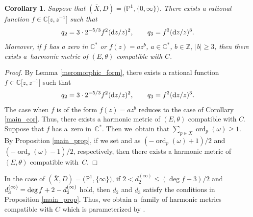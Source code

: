 \documentclass[pdftex]{sigma}
\numberwithin{equation}{section}
\newtheorem{Corollary}[Theorem]{Corollary}
\newcommand{\C}{\mathbb{C}}
\newcommand{\Z}{\mathbb{Z}}
\newcommand{\ps}{\mathbb{P}}
\newcommand{\ord}{\operatorname{ord}}
\begin{document}
\begin{Corollary}\label{main_Cstar_cor}
 Suppose that $(\overline{X},D) = \bigl(\ps^1,\{0,\infty\}\bigr)$. There exists a rational function $f\in \C\bigl[z,z^{-1}\bigr]$ such that
 \begin{equation*}
 q_2 = 3\cdot 2^{-5/3}f^2 ({\rm d}z/z)^2, \qquad q_3 = f^3 ({\rm d}z/z)^3.
 \end{equation*}
 Moreover, if $f$ has a zero in $\C^*$ or $f(z)=a z^b$, $a\in\C^*$, $b\in\Z$, $|b|\geq 3$, then there exists a~harmonic metric of $(E,\theta)$ compatible with $C$.
\end{Corollary}

\begin{proof}
 By Lemma \ref{meromorphic_form}, there exists a rational function $f\in \C\bigl[z,z^{-1}\bigr]$ such that
 \begin{equation*}
 q_2 = 3\cdot 2^{-5/3}f^2 ({\rm d}z/z)^2, \qquad q_3 = f^3 ({\rm d}z/z)^3.
 \end{equation*}
 The case when $f$ is of the form $f(z)=az^b$ reduces to the case of Corollary \ref{main_cor}. Thus, there exists a harmonic metric of $(E,\theta)$ compatible with $C$. Suppose that $f$ has a~zero in~$\C^*$. Then we~obtain that $\sum_{p\in X}\ord_p(\omega)\geq 1$. By Proposition \ref{main_prop}, if we set  and  as $(-\ord_{p}(\omega)+1)/2$ and $(-\ord_{p}(\omega)-1)/2$, respectively, then there exists a harmonic metric of $(E,\theta)$ compatible with~$C$.
\end{proof}

\begin{Remark}\label{condition_of_d_2}
 In the case of $(\overline{X},D)=\bigl(\ps^1,\{\infty\}\bigr)$, if $2< d_2^{(\infty)} \leq (\deg{f} + 3 )/2$ and $d_3^{(\infty)} = \smash{\deg{f} +2 - d_2^{(\infty)}}$ hold, then $d_2$ and $d_3$ satisfy the conditions in Proposition \ref{main_prop}. Thus, we obtain a~family of harmonic metrics compatible with $C$ which is parameterized by .
\end{Remark}
\end{document}

